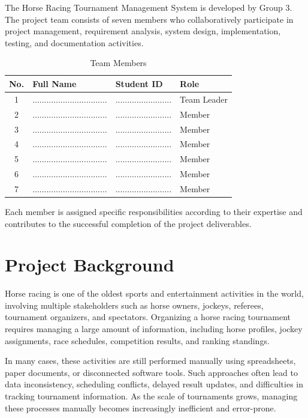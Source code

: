 The Horse Racing Tournament Management System is developed by Group 3. The project team consists of seven members who collaboratively participate in project management, requirement analysis, system design, implementation, testing, and documentation activities.

\begin{table}[H]
	\centering
	\caption{Team Members}
	\begin{tabular}{|c|p{6cm}|p{4cm}|p{3cm}|}
		\hline
		\textbf{No.} & \textbf{Full Name} & \textbf{Student ID} & \textbf{Role} \\
		\hline
		1 & ................................ & ........................ & Team Leader \\
		\hline
		2 & ................................ & ........................ & Member \\
		\hline
		3 & ................................ & ........................ & Member \\
		\hline
		4 & ................................ & ........................ & Member \\
		\hline
		5 & ................................ & ........................ & Member \\
		\hline
		6 & ................................ & ........................ & Member \\
		\hline
		7 & ................................ & ........................ & Member \\
		\hline
	\end{tabular}
\end{table}

Each member is assigned specific responsibilities according to their expertise and contributes to the successful completion of the project deliverables.

\section{Project Background}

Horse racing is one of the oldest sports and entertainment activities in the world, involving multiple stakeholders such as horse owners, jockeys, referees, tournament organizers, and spectators. Organizing a horse racing tournament requires managing a large amount of information, including horse profiles, jockey assignments, race schedules, competition results, and ranking standings.

In many cases, these activities are still performed manually using spreadsheets, paper documents, or disconnected software tools. Such approaches often lead to data inconsistency, scheduling conflicts, delayed result updates, and difficulties in tracking tournament information. As the scale of tournaments grows, managing these processes manually becomes increasingly inefficient and error-prone.

